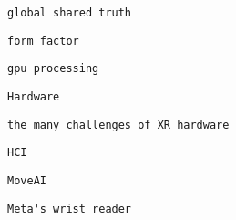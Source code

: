            
           
            \protect\hypertarget{ID_1834010353}{}{}

\begin{verbatim}
global shared truth
\end{verbatim}
           

           
           
            \protect\hypertarget{ID_490064908}{}{}

\begin{verbatim}
form factor
\end{verbatim}
           

           
           
            \protect\hypertarget{ID_497735380}{}{}

\begin{verbatim}
gpu processing
\end{verbatim}
           
         
       
     

     
     
      \protect\hypertarget{ID_152183139}{}{}

\begin{verbatim}
Hardware
\end{verbatim}

       
       
        \protect\hypertarget{ID_1799317256}{}{}

\begin{verbatim}
the many challenges of XR hardware
\end{verbatim}
       
     

     
     
      \protect\hypertarget{ID_1859862476}{}{}

\begin{verbatim}
HCI
\end{verbatim}

       
       
        \protect\hypertarget{ID_1050867697}{}{}

\begin{verbatim}
MoveAI
\end{verbatim}
       

       
       
        \protect\hypertarget{ID_1781965623}{}{}

\begin{verbatim}
Meta's wrist reader
\end{verbatim}
       

